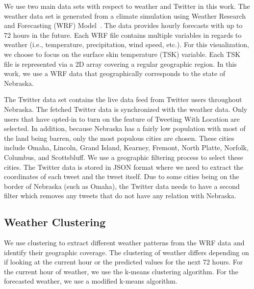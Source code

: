 We use two main data sets with respect to weather and Twitter in this work. The weather data set is generated from a climate simulation using Weather Research and Forecasting (WRF) Model~\cite{Michalakes2004}. %
The data provides hourly forecasts with up to 72 hours in the future. Each WRF file contains multiple variables in regards to weather (i.e., temperature, precipitation, wind speed, etc.). For this visualization, we choose to focus on the surface skin temperature (TSK) variable. Each TSK file is represented via a 2D array %
covering a regular geographic region. In this work, we use a WRF data that geographically corresponds to the state of Nebraska.

The Twitter data set contains the live data feed from Twitter users throughout Nebraska. The fetched Twitter data is synchronized with the weather data. Only users that have opted-in to turn on the feature of Tweeting With Location are selected. In addition, because Nebraska has a fairly low population with most of the land being barren, only the most populous cities are chosen. These cities include Omaha, Lincoln, Grand Island, Kearney, Fremont, North Platte, Norfolk, Columbus, and Scottsbluff. We use a geographic filtering process to select these cities. The Twitter data is stored in JSON format where we need to extract the coordinates of each tweet and the tweet itself. Due to some cities being on the border of Nebraska (such as Omaha), the Twitter data needs to have a second filter which removes any tweets that do not have any relation with Nebraska.


\subsection{Weather Clustering}
\label{sec:clust}

We use clustering to extract different weather patterns from the WRF data and identify their geographic coverage. The clustering of weather differs depending on if looking at the current hour or the predicted values for the next 72 hours. For the current hour of weather, we use the k-means clustering algorithm. For the forecasted weather, we use a modified k-means algorithm.

